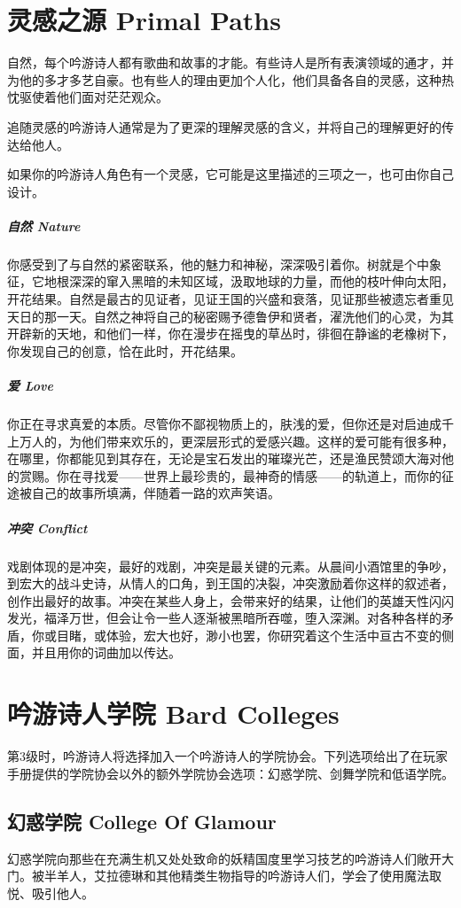 \section{灵感之源 Primal Paths}自然，每个吟游诗人都有歌曲和故事的才能。有些诗人是所有表演领域的通才，并为他的多才多艺自豪。也有些人的理由更加个人化，他们具备各自的灵感，这种热忱驱使着他们面对茫茫观众。

追随灵感的吟游诗人通常是为了更深的理解灵感的含义，并将自己的理解更好的传达给他人。

如果你的吟游诗人角色有一个灵感，它可能是这里描述的三项之一，也可由你自己设计。
\subparagraph{自然 Nature}

你感受到了与自然的紧密联系，他的魅力和神秘，深深吸引着你。树就是个中象征，它地根深深的窜入黑暗的未知区域，汲取地球的力量，而他的枝叶伸向太阳，开花结果。自然是最古的见证者，见证王国的兴盛和衰落，见证那些被遗忘者重见天日的那一天。自然之神将自己的秘密赐予德鲁伊和贤者，濯洗他们的心灵，为其开辟新的天地，和他们一样，你在漫步在摇曳的草丛时，徘徊在静谧的老橡树下，你发现自己的创意，恰在此时，开花结果。
\subparagraph{爱 Love}

你正在寻求真爱的本质。尽管你不鄙视物质上的，肤浅的爱，但你还是对启迪成千上万人的，为他们带来欢乐的，更深层形式的爱感兴趣。这样的爱可能有很多种，在哪里，你都能见到其存在，无论是宝石发出的璀璨光芒，还是渔民赞颂大海对他的赏赐。你在寻找爱——世界上最珍贵的，最神奇的情感——的轨道上，而你的征途被自己的故事所填满，伴随着一路的欢声笑语。
\subparagraph{冲突 Conflict}

戏剧体现的是冲突，最好的戏剧，冲突是最关键的元素。从晨间小酒馆里的争吵，到宏大的战斗史诗，从情人的口角，到王国的决裂，冲突激励着你这样的叙述者，创作出最好的故事。冲突在某些人身上，会带来好的结果，让他们的英雄天性闪闪发光，福泽万世，但会让令一些人逐渐被黑暗所吞噬，堕入深渊。对各种各样的矛盾，你或目睹，或体验，宏大也好，渺小也罢，你研究着这个生活中亘古不变的侧面，并且用你的词曲加以传达。
\section{吟游诗人学院 Bard Colleges}第3级时，吟游诗人将选择加入一个吟游诗人的学院协会。下列选项给出了在玩家手册提供的学院协会以外的额外学院协会选项：幻惑学院、剑舞学院和低语学院。

\subsection{幻惑学院 College Of Glamour}幻惑学院向那些在充满生机又处处致命的妖精国度里学习技艺的吟游诗人们敞开大门。被半羊人，艾拉德琳和其他精类生物指导的吟游诗人们，学会了使用魔法取悦、吸引他人。

